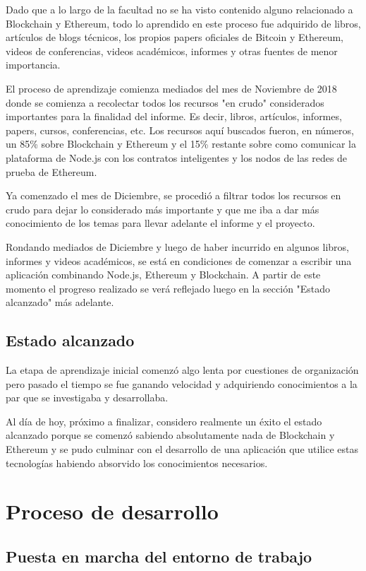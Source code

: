 Dado que a lo largo de la facultad no se ha visto contenido alguno relacionado a Blockchain y 
Ethereum, todo lo aprendido en este proceso fue adquirido de libros, artículos de blogs 
técnicos, los propios papers oficiales de Bitcoin y Ethereum, videos de conferencias, videos 
académicos, informes y otras fuentes de menor importancia.

El proceso de aprendizaje comienza mediados del mes de Noviembre de 2018 donde se comienza a 
recolectar todos los recursos "en crudo" considerados importantes para la finalidad del informe.
Es decir, libros, artículos, informes, papers, cursos, conferencias, etc. Los recursos aquí 
buscados fueron, en números, un 85\% sobre Blockchain y Ethereum y el 15\% restante sobre como
comunicar la plataforma de Node.js con los contratos inteligentes y los nodos de las redes de 
prueba de Ethereum.

Ya comenzado el mes de Diciembre, se procedió a filtrar todos los recursos en crudo para dejar
lo considerado más importante y que me iba a dar más conocimiento de los temas para llevar adelante
el informe y el proyecto.

Rondando mediados de Diciembre y luego de haber incurrido en algunos libros, informes y videos 
académicos, se está en condiciones de comenzar a escribir una aplicación combinando Node.js, 
Ethereum y Blockchain. A partir de este momento el progreso realizado se verá reflejado luego 
en la sección "Estado alcanzado" más adelante.


\subsection{Estado alcanzado}
La etapa de aprendizaje inicial comenzó algo lenta por cuestiones de organización pero pasado
el tiempo se fue ganando velocidad y adquiriendo conocimientos a la par que se investigaba y 
desarrollaba.

Al día de hoy, próximo a finalizar, considero realmente un éxito el estado alcanzado porque 
se comenzó sabiendo absolutamente nada de Blockchain y Ethereum y se pudo culminar con el 
desarrollo de una aplicación que utilice estas tecnologías habiendo absorvido los conocimientos
necesarios.

\section{Proceso de desarrollo}

\subsection{Puesta en marcha del entorno de trabajo}

